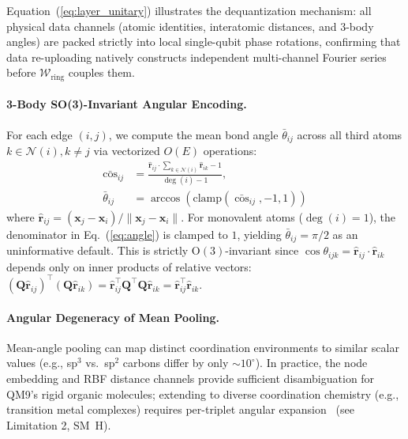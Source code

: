 \documentclass[10pt,twocolumn,letterpaper]{article}
\begin{document}
Equation~(\ref{eq:layer_unitary}) illustrates the dequantization mechanism: all physical data channels (atomic identities, interatomic distances, and 3-body angles) are packed strictly into local single-qubit phase rotations, confirming that data re-uploading natively constructs independent multi-channel Fourier series before $\mathcal{W}_{\mathrm{ring}}$ couples them.

\paragraph{3-Body SO(3)-Invariant Angular Encoding.}
For each edge $(i, j)$, we compute the mean bond angle $\bar{\theta}_{ij}$ across all third atoms $k \in \mathcal{N}(i), k \neq j$ via vectorized $O(E)$ operations:
\begin{align}
    \bar{\cos}_{ij} &= \frac{\hat{\mathbf{r}}_{ij} \cdot \sum_{k \in \mathcal{N}(i)} \hat{\mathbf{r}}_{ik} - 1}{\deg(i) - 1}, \label{eq:angle} \\
    \bar{\theta}_{ij} &= \arccos\!\left(\mathrm{clamp}(\bar{\cos}_{ij}, -1, 1)\right) \nonumber
\end{align}
where $\hat{\mathbf{r}}_{ij} = (\mathbf{x}_j - \mathbf{x}_i) / \|\mathbf{x}_j - \mathbf{x}_i\|$. For monovalent atoms ($\deg(i) = 1$), the denominator in Eq.~(\ref{eq:angle}) is clamped to $1$, yielding $\bar{\theta}_{ij} = \pi/2$ as an uninformative default. This is strictly $\mathrm{O}(3)$-invariant since $\cos \theta_{ijk} = \hat{\mathbf{r}}_{ij} \cdot \hat{\mathbf{r}}_{ik}$ depends only on inner products of relative vectors: $(\mathbf{Q}\hat{\mathbf{r}}_{ij})^\top (\mathbf{Q}\hat{\mathbf{r}}_{ik}) = \hat{\mathbf{r}}_{ij}^\top \mathbf{Q}^\top \mathbf{Q} \hat{\mathbf{r}}_{ik} = \hat{\mathbf{r}}_{ij}^\top \hat{\mathbf{r}}_{ik}$.

\paragraph{Angular Degeneracy of Mean Pooling.}
Mean-angle pooling can map distinct coordination environments to similar scalar values (e.g., sp$^3$ vs.\ sp$^2$ carbons differ by only $\sim 10^\circ$). In practice, the node embedding and RBF distance channels provide sufficient disambiguation for QM9's rigid organic molecules; extending to diverse coordination chemistry (e.g., transition metal complexes) requires per-triplet angular expansion~\cite{klicperaFastUncertaintyAwareDirectional2020, klicperaGemNetUniversalDirectional2021} (see Limitation 2, SM~H).
\end{document}
